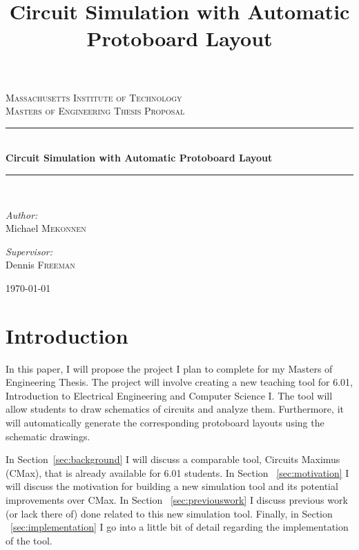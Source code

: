 \documentclass[12pt, doublespacing]{amsart}
\title{Circuit Simulation with Automatic Protoboard Layout}
\newcommand{\HRule}{\rule{\linewidth}{0.5mm}}
\begin{document}
\begin{titlepage}
\begin{center}

\textsc{\LARGE Massachusetts Institute of Technology}\\[1.5cm]

\textsc{\Large Masters of Engineering Thesis Proposal}\\[0.5cm]

\HRule \\[0.4cm]
{ \huge \bfseries Circuit Simulation with Automatic Protoboard Layout}\\[0.4cm]
\HRule \\[1.5cm]

\begin{minipage}{0.4\textwidth}
\begin{flushleft} \large
\emph{Author:} \\
Michael \textsc{Mekonnen}
\end{flushleft}
\end{minipage}
\begin{minipage}{0.4\textwidth}
\begin{flushright} \large
\emph{Supervisor:} \\
Dennis \textsc{Freeman}
\end{flushright}
\end{minipage}

\vfill

{\large \today}

\end{center}
\end{titlepage}

\maketitle

\section{Introduction}

In this paper, I will propose the project I plan to complete for my Masters of Engineering Thesis. The project will involve creating a new teaching tool for 6.01, Introduction to Electrical Engineering and Computer Science I. The tool will allow students to draw schematics of circuits and analyze them. Furthermore, it will automatically generate the corresponding protoboard layouts using the schematic drawings.

In Section~\ref{sec:background} I will discuss a comparable tool, Circuits Maximus (CMax), that is already available for 6.01 students. In Section ~\ref{sec:motivation} I will discuss the motivation for building a new simulation tool and its potential improvements over CMax. In Section ~\ref{sec:previouswork} I discuss previous work (or lack there of) done related to this new simulation tool. Finally, in Section ~\ref{sec:implementation} I go into a little bit of detail regarding the implementation of the tool.
\end{document}
